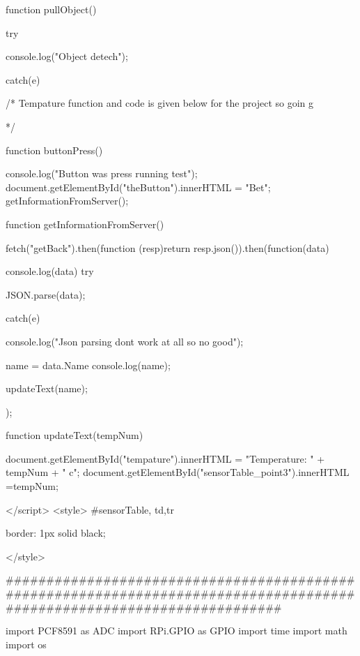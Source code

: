 	
	function pullObject() { 
		
			try {
				console.log("Object detech");
				
				
			}catch(e) { 
				
				
				
			}
		
	}
	
	
	/* 
		Tempature function and code is given below for the project so goin g
	
	*/
	
	
	function buttonPress() { 
		
			console.log("Button was press running test");
			document.getElementById("theButton").innerHTML = "Bet";
			getInformationFromServer();
			
	}
	
	function getInformationFromServer() { 
		
		fetch("getBack").then(function (resp){return resp.json()}).then(function(data)
		{
			
			console.log(data)
			try { 
				
				
				
				
				JSON.parse(data);
			
			
			}catch(e) { 
				
					console.log("Json parsing dont work at all so no good");
				
			}
			
			name = data.Name
			console.log(name);
			
			
			updateText(name);
			
			
			
			
		});
		
		
			
		
		
	}
	
	function updateText(tempNum){ 
		
		document.getElementById("tempature").innerHTML = "Temperature: " + tempNum + " c";
		document.getElementById("sensorTable_point3").innerHTML =tempNum;
		
		
	}

	
</script>
<style>
	#sensorTable, td,tr{ 
		
		border: 1px solid black;
		
	}

</style>

########################################################################################################################


import PCF8591 as ADC
import RPi.GPIO as GPIO
import time
import math
import os

